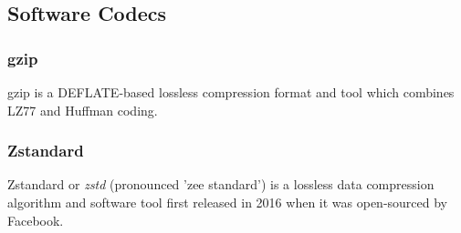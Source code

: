 \subsection{Software Codecs}

\subsubsection{gzip}
gzip is a DEFLATE-based lossless compression format and tool which combines LZ77 and Huffman coding.

\subsubsection{Zstandard}

Zstandard or \textit{zstd} (pronounced 'zee standard') is a lossless data compression algorithm and software tool first released in 2016 when it was open-sourced by Facebook.
